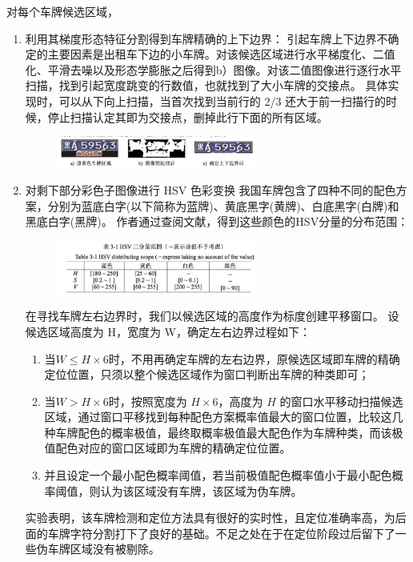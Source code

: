 \begin{enumerate}
对每个车牌候选区域，
\begin{enumerate}
\item
利用其梯度形态特征分割得到车牌精确的上下边界：
引起车牌上下边界不确定的主要因素是出租车下边的小车牌。对该候选区域进行水平梯度化、二值化、平滑去噪以及形态学膨胀之后得到b）图像。对该二值图像进行逐行水平扫描，找到引起宽度跳变的行数值，也就找到了大小车牌的交接点。
具体实现时，可以从下向上扫描，当首次找到当前行的 2/3 还大于前一扫描行的时候，停止扫描认定其即为交接点，删掉此行下面的所有区域。
\begin{figure}[H]
    \centering 
    \includegraphics[width=0.618\textwidth]{image/2_5_3.jpg}    
    \label{logic}
\end{figure}
\item
对剩下部分彩色子图像进行 HSV 色彩变换
我国车牌包含了四种不同的配色方案，分别为蓝底白字(以下简称为蓝牌)、黄底黑字(黄牌)、白底黑字(白牌)和黑底白字(黑牌)。 作者通过查阅文献，得到这些颜色的HSV分量的分布范围：
\begin{figure}[H]
    \centering 
    \includegraphics[width=0.618\textwidth]{image/2_5_4.jpg}    
    \label{logic}
\end{figure}
在寻找车牌左右边界时，我们以候选区域的高度作为标度创建平移窗口。 设候选区域高度为 H，宽度为 W，确定左右边界过程如下：
\begin{enumerate}
\item
当$W \leq H\times 6$时，不用再确定车牌的左右边界，原候选区域即车牌的精确定位位置，只须以整个候选区域作为窗口判断出车牌的种类即可；
\item
当$W > H\times 6$时，按照宽度为 $H \times 6$，高度为 $H$ 的窗口水平移动扫描候选区域，通过窗口平移找到每种配色方案概率值最大的窗口位置，比较这几种车牌配色的概率极值，最终取概率极值最大配色作为车牌种类，而该极值配色对应的窗口区域即为车牌的精确定位位置。 
\item
并且设定一个最小配色概率阈值，若当前极值配色概率值小于最小配色概率阈值，则认为该区域没有车牌，该区域为伪车牌。
\end{enumerate}
实验表明，该车牌检测和定位方法具有很好的实时性，且定位准确率高，为后面的车牌字符分割打下了良好的基础。不足之处在于在定位阶段过后留下了一些伪车牌区域没有被剔除。 
\end{enumerate}
\end{enumerate}
